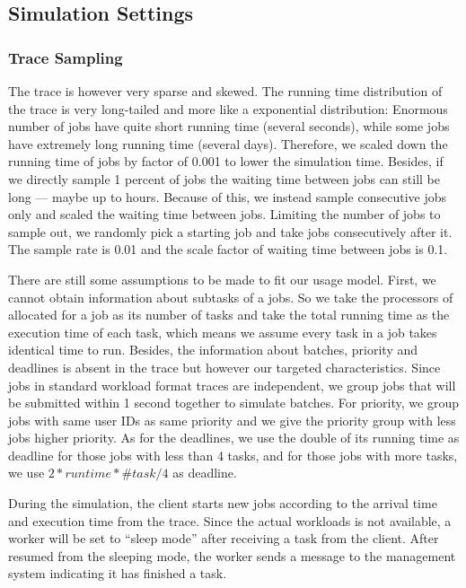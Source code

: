 \subsection{Simulation Settings}
\subsubsection{Trace Sampling}

The trace is however very sparse and skewed.
The running time distribution of the trace is very long-tailed and more
like a exponential distribution: Enormous number of jobs have quite
short running time (several seconds), while some jobs have extremely
long running time (several days).
Therefore, we scaled down the running time of jobs by factor of 0.001 to
lower the simulation time.
Besides, if we directly sample 1 percent of jobs the waiting time
between jobs can still be long --- maybe up to hours.
Because of this, we instead sample consecutive jobs only and scaled the
waiting time between jobs.
Limiting the number of jobs to sample out, we randomly pick a starting
job and take jobs consecutively after it.
The sample rate is 0.01 and the scale factor of waiting time between
jobs is 0.1.

There are still some assumptions to be made to fit our usage model.
First, we cannot obtain information about subtasks of a jobs.
So we take the processors of allocated for a job as its number of tasks
and take the total running time as the execution time of each task,
which means we assume every task in a job takes identical time to run.
Besides, the information about batches, priority and deadlines is absent
in the trace but however our targeted characteristics.
Since jobs in standard workload format traces are independent, we group
jobs that will be submitted within 1 second together to simulate
batches.
For priority, we group jobs with same user IDs as same priority and we
give the priority group with less jobs higher priority.
As for the deadlines, we use the double of its running time as deadline
for those jobs with less than 4 tasks, and for those jobs with more
tasks, we use $2 * runtime * \#task / 4$ as deadline.

During the simulation, the client starts new jobs according to the
arrival time and execution time from the trace.
Since the actual workloads is not available, a worker will be set to
``sleep mode'' after receiving a task from the client.
After resumed from the sleeping mode, the worker sends a message to the
management system indicating it has finished a task.

